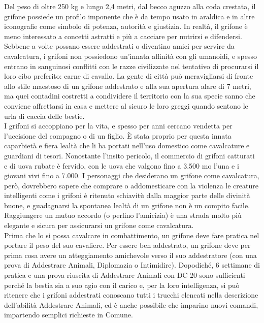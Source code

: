 \begin{multicols}{2}
Del peso di oltre 250 kg e lungo 2,4 metri, dal becco aguzzo alla coda crestata, il grifone possiede un profilo imponente che è da tempo usato in araldica e in altre iconografie come simbolo di potenza, autorità e giustizia. In realtà, il grifone è meno interessato a concetti astratti e più a cacciare per nutrirsi e difendersi. Sebbene a volte possano essere addestrati o diventino amici per servire da cavalcatura, i grifoni non possiedono un'innata affinità con gli umanoidi, e spesso entrano in sanguinosi conflitti con le razze civilizzate nel tentativo di procurarsi il loro cibo preferito: carne di cavallo. La gente di città può meravigliarsi di fronte allo stile maestoso di un grifone addestrato e alla sua apertura alare di 7 metri, ma quei contadini costretti a condividere il territorio con la sua specie sanno che conviene affrettarsi in casa e mettere al sicuro le loro greggi quando sentono le urla di caccia delle bestie.\\

I grifoni si accoppiano per la vita, e spesso per anni cercano vendetta per l'uccisione del compagno o di un figlio. È stata proprio per questa innata caparbietà e fiera lealtà che li ha portati nell'uso domestico come cavalcature e guardiani di tesori. Nonostante l'insito pericolo, il commercio di grifoni catturati e di uova rubate è fervido, con le uova che valgono fino a 3.500 mo l'una e i giovani vivi fino a 7.000. I personaggi che desiderano un grifone come cavalcatura, però, dovrebbero sapere che comprare o addomesticare con la violenza le creature intelligenti come i grifoni è ritenuto schiavitù dalla maggior parte delle divinità buone, e guadagnarsi la spontanea lealtà di un grifone non è un compito facile. Raggiungere un mutuo accordo (o perfino l'amicizia) è una strada molto più elegante e sicura per assicurarsi un grifone come cavalcatura.\\

Prima che lo si possa cavalcare in combattimento, un grifone deve fare pratica nel portare il peso del suo cavaliere. Per essere ben addestrato, un grifone deve per prima cosa avere un atteggiamento amichevole verso il suo addestratore (con una prova di Addestrare Animali, Diplomazia o Intimidire). Dopodiché, 6 settimane di pratica e una prova riuscita di Addestrare Animali con DC 20 sono sufficienti perché la bestia sia a suo agio con il carico e, per la loro intelligenza, si può ritenere che i grifoni addestrati conoscano tutti i trucchi elencati nella descrizione dell'abilità Addestrare Animali, ed è anche possibile che imparino nuovi comandi, impartendo semplici richieste in Comune.\\


\end{multicols}
